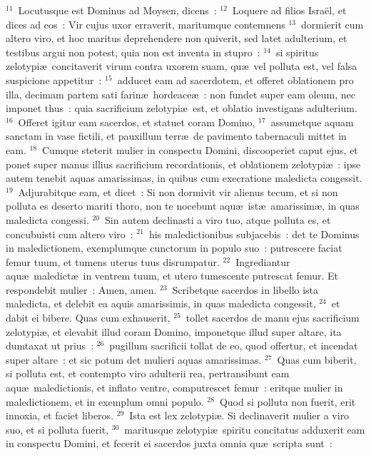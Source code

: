 ${}^{11}$~Locutusque est Dominus ad Moysen, dicens~:
${}^{12}$~Loquere ad filios Isra\"el, et dices ad eos~: Vir cujus uxor erraverit, maritumque contemnens
${}^{13}$~dormierit cum altero viro, et hoc maritus deprehendere non quiverit, sed latet adulterium, et testibus argui non potest, quia non est inventa in stupro~:
${}^{14}$~si spiritus zelotypi\ae\ concitaverit virum contra uxorem suam, qu\ae\ vel polluta est, vel falsa suspicione appetitur~:
${}^{15}$~adducet eam ad sacerdotem, et offeret oblationem pro illa, decimam partem sati farin\ae\ hordeace\ae~: non fundet super eam oleum, nec imponet thus~: quia sacrificium zelotypi\ae\ est, et oblatio investigans adulterium.
${}^{16}$~Offeret igitur eam sacerdos, et statuet coram Domino,
${}^{17}$~assumetque aquam sanctam in vase fictili, et pauxillum terr\ae\ de pavimento tabernaculi mittet in eam.
${}^{18}$~Cumque steterit mulier in conspectu Domini, discooperiet caput ejus, et ponet super manus illius sacrificium recordationis, et oblationem zelotypi\ae~: ipse autem tenebit aquas amarissimas, in quibus cum execratione maledicta congessit.
${}^{19}$~Adjurabitque eam, et dicet~: Si non dormivit vir alienus tecum, et si non polluta es deserto mariti thoro, non te nocebunt aqu\ae\ ist\ae\ amarissim\ae , in quas maledicta congessi.
${}^{20}$~Sin autem declinasti a viro tuo, atque polluta es, et concubuisti cum altero viro~:
${}^{21}$~his maledictionibus subjacebis~: det te Dominus in maledictionem, exemplumque cunctorum in populo suo~: putrescere faciat femur tuum, et tumens uterus tuus disrumpatur.
${}^{22}$~Ingrediantur aqu\ae\ maledict\ae\ in ventrem tuum, et utero tumescente putrescat femur. Et respondebit mulier~: Amen, amen.
${}^{23}$~Scribetque sacerdos in libello ista maledicta, et delebit ea aquis amarissimis, in quas maledicta congessit,
${}^{24}$~et dabit ei bibere. Quas cum exhauserit,
${}^{25}$~tollet sacerdos de manu ejus sacrificium zelotypi\ae , et elevabit illud coram Domino, imponetque illud super altare, ita dumtaxat ut prius~:
${}^{26}$~pugillum sacrificii tollat de eo, quod offertur, et incendat super altare~: et sic potum det mulieri aquas amarissimas.
${}^{27}$~Quas cum biberit, si polluta est, et contempto viro adulterii rea, pertransibunt eam aqu\ae\ maledictionis, et inflato ventre, computrescet femur~: eritque mulier in maledictionem, et in exemplum omni populo.
${}^{28}$~Quod si polluta non fuerit, erit innoxia, et faciet liberos.
${}^{29}$~Ista est lex zelotypi\ae . Si declinaverit mulier a viro suo, et si polluta fuerit,
${}^{30}$~maritusque zelotypi\ae\ spiritu concitatus adduxerit eam in conspectu Domini, et fecerit ei sacerdos juxta omnia qu\ae\ scripta sunt~:

